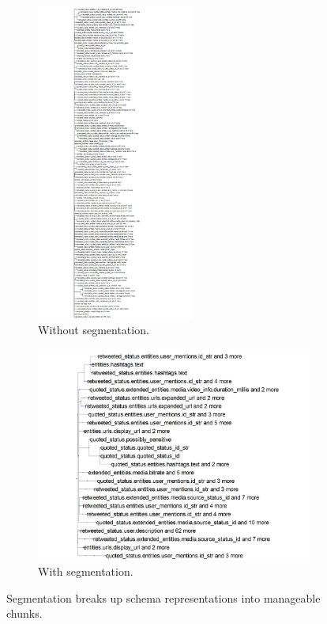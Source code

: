 \begin{figure}
  \centering
  \begin{subfigure}{0.4\columnwidth}
    \centering
    \includegraphics[width=0.57\textwidth]{SchemaSummarization/img/twitterFullTree.png}
    \caption{Without segmentation.}
    \label{fig:seg:twitterFull}
  \end{subfigure}
  \begin{subfigure}{0.59\columnwidth}
    \centering
    \includegraphics[width=\textwidth]{SchemaSummarization/img/twitterSegment.png}
    \caption{With segmentation.}
    \label{fig:seg:twitterSeg}
  \end{subfigure}
  \caption{Segmentation breaks up schema representations into manageable chunks.}
  \label{fig:seg}
\end{figure}

